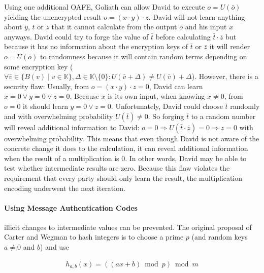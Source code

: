 Using one additional OAFE, Goliath can allow David to execute $o = U(\bar{o})$
yielding the unencrypted result $o = (x \cdot y) \cdot z$. David will not learn
anything about $y$, $t$ or $z$ that it cannot calculate from the output $o$ and
his input $x$ anyways. David could try to forge the value of $\bar{t}$ before
calculating $\bar{t} \cdot \bar{z}$ but because it has no information about the
encryption keys of $\bar{t}$ or $\bar{z}$ it will render $o = U(\bar{o})$ to
randomness because it will contain random terms depending on some encryption key
($\forall \bar{v} \in \{B(v) \mid v \in \mathbb{K}\}, \Delta \in \mathbb{K}
\setminus \{0\}: U(\bar{v}+\Delta) \neq U(\bar{v})+\Delta$).  However, there is
a security flaw: Usually, from $o = (x \cdot y) \cdot z = 0$, David can learn $x
= 0 \vee y = 0 \vee z = 0$. Because $x$ is its own input, when knowing $x \neq
0$, from $o = 0$ it should learn $y = 0 \vee z = 0$.  Unfortunately, David could
choose $\bar{t}$ randomly and with overwhelming probability $U(\bar{t}) \neq 0$.
So forging $\bar{t}$ to a random number will reveal additional information to
David: $o = 0 \Rightarrow U(\bar{t} \cdot \bar{z}) = 0 \Rightarrow z = 0$ with
overwhelming probability. This means that even though David is not aware of the
concrete change it does to the calculation, it can reveal additional information
when the result of a multiplication is $0$. In other words, David may be able to
test whether intermediate results are zero. Because this flaw violates the
requirement that every party should only learn the result, the multiplication
encoding underwent the next iteration.

\paragraph{Using Message Authentication Codes} illicit changes to intermediate
values can be prevented. The original proposal of Carter and Wegman
\cite{carter79} to hash integers is to choose a prime $p$ (and random keys $a
\neq 0$ and $b$) and use

\begin{align*}
  h_{a,b}(x) = ((ax + b) \bmod p) \bmod m
\end{align*}

